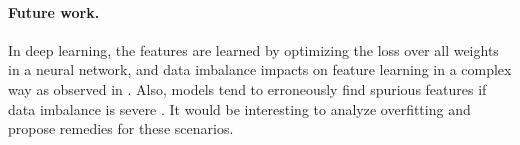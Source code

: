 \paragraph{Future work.} In deep learning, the features are learned by optimizing the loss over all weights in a neural network, and data imbalance impacts on feature learning in a complex way as observed in \cite{cao2019learning}. Also, models tend to erroneously find spurious features if data imbalance is severe \cite{sagawa2020investigation}. It would be interesting to analyze overfitting and propose remedies for these scenarios.

